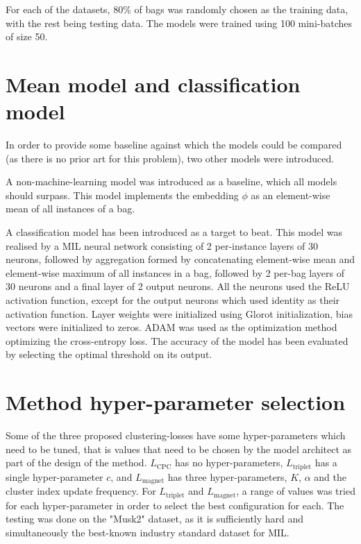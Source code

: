 For each of the datasets, 80\% of bags was randomly chosen as the training data, with the rest being testing data. The models were trained using 100 mini-batches of size 50.

\section{Mean model and classification model}\label{sec:baseline-models}

In order to provide some baseline against which the models could be compared (as there is no prior art for this problem), two other models were introduced.

A non-machine-learning model was introduced as a baseline, which all models should surpass. This model implements the embedding \( \phi \) as an element-wise mean of all instances of a bag.

A classification model has been introduced as a target to beat. This model was realised by a MIL neural network consisting of 2 per-instance layers of 30 neurons, followed by aggregation formed by concatenating element-wise mean and element-wise maximum of all instances in a bag, followed by 2 per-bag layers of 30 neurons and a final layer of 2 output neurons. All the neurons used the ReLU activation function, except for the output neurons which used identity as their activation function. Layer weights were initialized using Glorot initialization, bias vectors were initialized to zeros. ADAM was used as the optimization method optimizing the cross-entropy loss. The accuracy of the model has been evaluated by selecting the optimal threshold on its output.

\section{Method hyper-parameter selection}

Some of the three proposed clustering-losses have some hyper-parameters which need to be tuned, that is values that need to be chosen by the model architect as part of the design of the method. \( L_\mathrm{CPC} \) has no hyper-parameters, \( L_\mathrm{triplet} \) has a single hyper-parameter \( c \), and \( L_\mathrm{magnet} \) has three hyper-parameters, \( K \), \( \alpha \) and the cluster index update frequency. For \( L_\mathrm{triplet} \) and \( L_\mathrm{magnet} \), a range of values was tried for each hyper-parameter in order to select the best configuration for each. The testing was done on the "Musk2" dataset, as it is sufficiently hard and simultaneously the best-known industry standard dataset for MIL.

